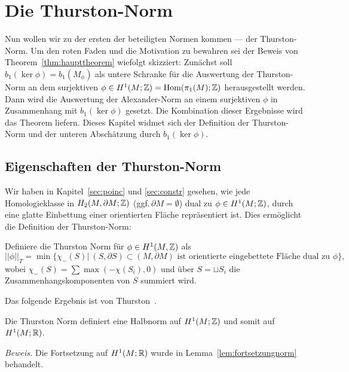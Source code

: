 
\section{Die Thurston-Norm}
	
	Nun wollen wir zu der ersten der beteiligten Normen kommen --- der Thurston-Norm. Um den roten Faden und die Motivation zu bewahren sei der Beweis von Theorem~\ref{thm:haupttheorem} wiefolgt skizziert: Zunächst soll $b_1(\ker\phi)=b_1(M_\phi)$ als untere Schranke für die Auswertung der Thurston-Norm an dem surjektiven $\phi \in H^1(M;\mathbb{Z}) = \operatorname{Hom} (\pi_1(M);\mathbb{Z})$ herausgestellt werden. Dann wird die Auswertung der Alexander-Norm an einem surjektiven $\phi$ in Zusammenhang mit $b_1(\ker\phi)$ gesetzt. Die Kombination dieser Ergebnisse wird das Theorem liefern. Dieses Kapitel widmet sich der Definition der Thurston-Norm und der unteren Abschätzung durch $b_1(\ker\phi)$.

	\subsection{Eigenschaften der Thurston-Norm}

        Wir haben in Kapitel~\ref{sec:poinc} und \ref{sec:constr} gesehen, wie jede Homologieklasse in $H_2(M,\partial M;\mathbb{Z})$ (ggf.\,$\partial M=\emptyset$) dual zu $\phi \in H^1(M;\mathbb{Z})$, durch eine glatte Einbettung einer orientierten Fläche repräsentiert ist. Dies  ermöglicht die Definition der Thurston-Norm:
        \begin{defn}
        	Definiere die Thurston Norm für $\phi \in H^1(M,\mathbb{Z})$ als
        	\[
        	        		||\phi||_T = \min\{ \chi_-(S)| ~(S,\partial S) \subset (M,\partial M)\text{ ist orientierte eingebettete Fläche dual zu } \phi \},
        	        	\]        	
        	wobei $\chi_-(S)=\sum \max (-\chi(S_i),0)$ und über $S=\sqcup S_i$ die Zusammenhangskomponenten von $S$ summiert wird.
        \end{defn}
        
        Das folgende Ergebnis ist von Thurston~\cite{Thurston.1986}.
        \begin{lem}
        \label{lem:norm}
        	Die Thurston Norm definiert eine Halbnorm auf $H^1(M;\mathbb{Z})$ und somit auf $H^1(M;\mathbb{R})$. 
        \end{lem}
          \noindent\textit{Beweis.}
          Die Fortsetzung auf $H^1(M;\mathbb{R})$ wurde in Lemma~\ref{lem:fortsetzungnorm} behandelt.

